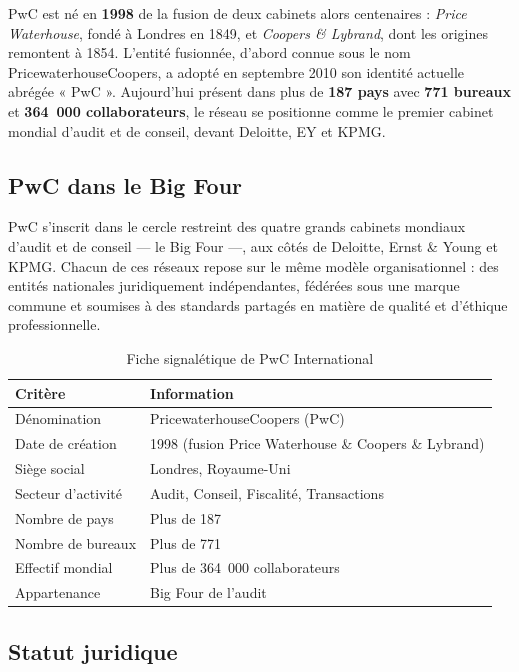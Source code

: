 PwC est né en \textbf{1998} de la fusion de deux cabinets alors centenaires :
\textit{Price Waterhouse}, fondé à Londres en 1849, et \textit{Coopers \& Lybrand},
dont les origines remontent à 1854. L'entité fusionnée, d'abord connue sous le nom
PricewaterhouseCoopers, a adopté en septembre 2010 son identité actuelle abrégée « PwC ».
Aujourd'hui présent dans plus de \textbf{187 pays} avec \textbf{771 bureaux} et
\textbf{364~000 collaborateurs}, le réseau se positionne comme le premier cabinet mondial
d'audit et de conseil, devant Deloitte, EY et KPMG.

\subsection{PwC dans le Big Four}

PwC s'inscrit dans le cercle restreint des quatre grands cabinets mondiaux d'audit et de
conseil --- le \og Big Four \fg{} ---, aux côtés de Deloitte, Ernst \& Young et KPMG.
Chacun de ces réseaux repose sur le même modèle organisationnel : des entités nationales
juridiquement indépendantes, fédérées sous une marque commune et soumises à des standards
partagés en matière de qualité et d'éthique professionnelle.

\begin{table}[H]
\centering
\caption{Fiche signalétique de PwC International}
\label{tab:fiche_pwc_intl}
\begin{tabular}{ll}
\toprule
\textbf{Critère}              & \textbf{Information} \\
\midrule
Dénomination                  & PricewaterhouseCoopers (PwC) \\
Date de création              & 1998 (fusion Price Waterhouse \& Coopers \& Lybrand) \\
Siège social                  & Londres, Royaume-Uni \\
Secteur d'activité            & Audit, Conseil, Fiscalité, Transactions \\
Nombre de pays                & Plus de 187 \\
Nombre de bureaux             & Plus de 771 \\
Effectif mondial              & Plus de 364~000 collaborateurs \\
Appartenance                  & Big Four de l'audit \\
\bottomrule
\end{tabular}
\end{table}

\subsection{Statut juridique}

